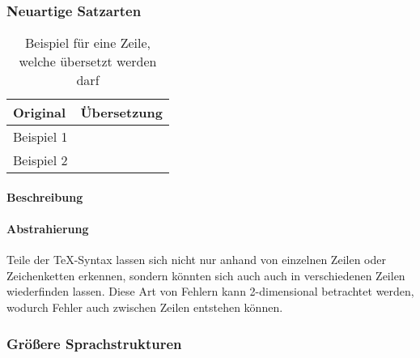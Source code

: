 \subsubsection{Neuartige Satzarten}\label{problems:dim2}
\begin{table}[h!]
    \centering
    \begin{tabularx}{\textwidth}{X X}
        \toprule
            Original & Übersetzung\\
        \midrule
            Beispiel 1 & \\[2em]
            Beispiel 2 & \\
        \bottomrule
    \end{tabularx}
    \caption{Beispiel für eine Zeile, welche übersetzt werden darf}\label{tab:problems:dim2}
\end{table}


\paragraph*{Beschreibung}
\paragraph*{Abstrahierung}
Teile der \TeX-Syntax lassen sich nicht nur anhand von einzelnen Zeilen oder Zeichenketten erkennen, sondern könnten sich auch auch in verschiedenen Zeilen wiederfinden lassen. Diese Art von Fehlern kann 2-dimensional betrachtet werden, wodurch Fehler auch zwischen Zeilen entstehen können.

\newpage

\subsubsection{Größere Sprachstrukturen}\label{problems:dim3}
